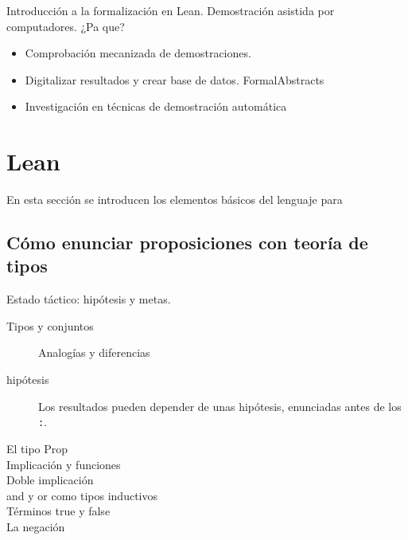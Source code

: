 Introducción a la formalización en Lean. Demostración asistida por computadores. ¿Pa que?
\begin{itemize}
	\item Comprobación mecanizada de demostraciones.
	\item Digitalizar resultados y crear base de datos.
	      FormalAbstracts
	\item Investigación en técnicas de demostración automática
\end{itemize}

\section{Lean}

En esta sección se introducen los elementos básicos del lenguaje para

\subsection{Cómo enunciar proposiciones con teoría de tipos}

Estado táctico: hipótesis y metas.

\begin{description}
	\item[Tipos y conjuntos] Analogías y diferencias
	\item[hipótesis] Los resultados pueden depender de unas hipótesis,
		enunciadas antes de los \lstinline{:}.
	\item[El tipo Prop]
	\item[Implicación y funciones]
	\item[Doble implicación]
	\item[and y or como tipos inductivos]
	\item[Términos true y false]
	\item[La negación]
\end{description}



